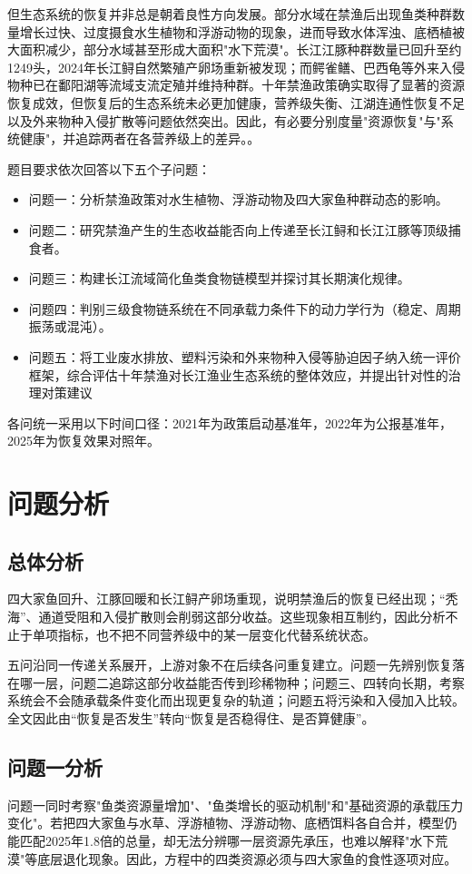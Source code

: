 \documentclass{MMCStyle}
\begin{document}
但生态系统的恢复并非总是朝着良性方向发展。部分水域在禁渔后出现鱼类种群数量增长过快、过度摄食水生植物和浮游动物的现象，进而导致水体浑浊、底栖植被大面积减少，部分水域甚至形成大面积"水下荒漠"。长江江豚种群数量已回升至约1249头，2024年长江鲟自然繁殖产卵场重新被发现；而鳄雀鳝、巴西龟等外来入侵物种已在鄱阳湖等流域支流定殖并维持种群。十年禁渔政策确实取得了显著的资源恢复成效，但恢复后的生态系统未必更加健康，营养级失衡、江湖连通性恢复不足以及外来物种入侵扩散等问题依然突出。因此，有必要分别度量"资源恢复"与"系统健康"，并追踪两者在各营养级上的差异。\cite{report2022,report2023}。

题目要求依次回答以下五个子问题：
\begin{itemize}
\item 问题一：分析禁渔政策对水生植物、浮游动物及四大家鱼种群动态的影响。
\item 问题二：研究禁渔产生的生态收益能否向上传递至长江鲟和长江江豚等顶级捕食者。
\item 问题三：构建长江流域简化鱼类食物链模型并探讨其长期演化规律。
\item 问题四：判别三级食物链系统在不同承载力条件下的动力学行为（稳定、周期振荡或混沌）。
\item 问题五：将工业废水排放、塑料污染和外来物种入侵等胁迫因子纳入统一评价框架，综合评估十年禁渔对长江渔业生态系统的整体效应，并提出针对性的治理对策建议
\end{itemize}
各问统一采用以下时间口径：2021年为政策启动基准年，2022年为公报基准年，2025年为恢复效果对照年\cite{yangtzeA}。

\section{问题分析}
\subsection{总体分析}
四大家鱼回升、江豚回暖和长江鲟产卵场重现，说明禁渔后的恢复已经出现；“秃海”、通道受阻和入侵扩散则会削弱这部分收益。这些现象相互制约，因此分析不止于单项指标，也不把不同营养级中的某一层变化代替系统状态。

五问沿同一传递关系展开，上游对象不在后续各问重复建立。问题一先辨别恢复落在哪一层，问题二追踪这部分收益能否传到珍稀物种；问题三、四转向长期，考察系统会不会随承载条件变化而出现更复杂的轨道；问题五将污染和入侵加入比较。全文因此由“恢复是否发生”转向“恢复是否稳得住、是否算健康”。

\subsection{问题一分析}
问题一同时考察"鱼类资源量增加"、"鱼类增长的驱动机制"和"基础资源的承载压力变化"。若把四大家鱼与水草、浮游植物、浮游动物、底栖饵料各自合并，模型仍能匹配2025年1.8倍的总量，却无法分辨哪一层资源先承压，也难以解释"水下荒漠"等底层退化现象。因此，方程中的四类资源必须与四大家鱼的食性逐项对应。
\end{document}
